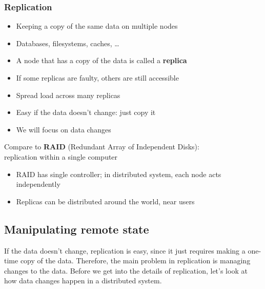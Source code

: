 \begin{frame}
    \label{s:replication-intro}
    \frametitle{Replication}
    \begin{itemize}
        \item Keeping a copy of the same data on multiple nodes
        \item Databases, filesystems, caches, \dots
        \item A node that has a copy of the data is called a \textbf{replica}\pause
        \item If some replicas are faulty, others are still accessible
        \item Spread load across many replicas\pause
        \item Easy if the data doesn't change: just copy it
        \item We will focus on data changes\\[1em]\pause
    \end{itemize}
    Compare to \textbf{RAID} (Redundant Array of Independent Disks):\\replication within a single computer
    \begin{itemize}
        \item RAID has single controller; in distributed system, each node acts independently
        \item Replicas can be distributed around the world, near users
    \end{itemize}
\end{frame}
\label{l:replication-intro}

\subsection{Manipulating remote state}

If the data doesn't change, replication is easy, since it just requires making a one-time copy of the data.
Therefore, the main problem in replication is managing changes to the data.
Before we get into the details of replication, let's look at how data changes happen in a distributed system.

